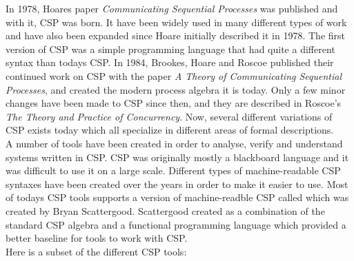 In 1978, Hoares paper \textit{Communicating Sequential Processes} was published and with it, CSP was born. It have been widely used in many different types of work and have also been expanded since Hoare initially described it in 1978\cite{Abdallah2005}. The first version of CSP was a simple programming language that had quite a different syntax than todays CSP. In 1984, Brookes, Hoare and Roscoe published their continued work on CSP with the paper \textit{A Theory of Communicating Sequential Processes}\cite{Brookes1984}, and created the modern process algebra it is today. Only a few minor changes have been made to CSP since then, and they are described in Roscoe's \textit{The Theory and Practice of Concurrency}\cite{Roscoe1997}. Now, several different variations of CSP exists today which all specialize in different areas of formal descriptions. %
\\
A number of tools have been created in order to analyse, verify and understand systems written in CSP. CSP was originally mostly a blackboard language and it was difficult to use it on a large scale. Different types of machine-readable CSP syntaxes have been created over the years in order to make it easier to use. Most of todays CSP tools supports a version of machine-readble CSP called \cspm{} which was created by Bryan Scattergood\cite{Scattergood1998}. Scattergood created \cspm{} as a combination of the standard CSP algebra and a functional programming language which provided a better baseline for tools to work with CSP.\\
Here is a subset of the different CSP tools:
